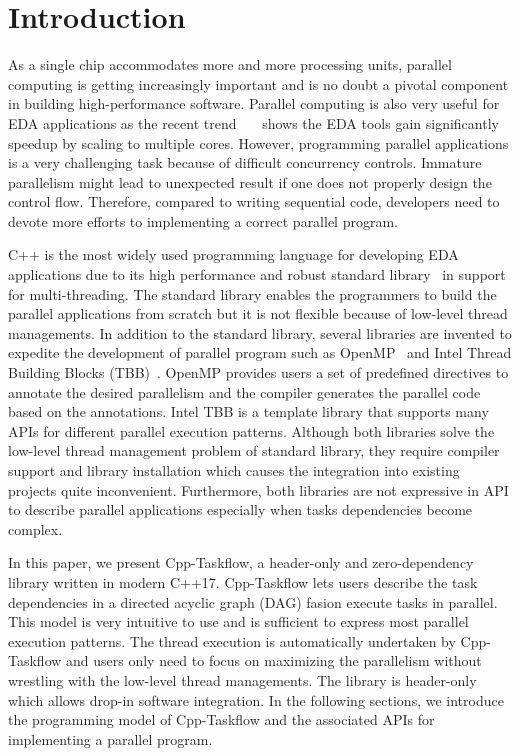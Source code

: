 \documentclass[sigconf]{acmart}
\begin{document}
\section{Introduction}
\label{sec::introduction}
As a single chip accommodates more and more processing units,
parallel computing is getting increasingly important
and is no doubt a pivotal
component in building high-performance software. 
Parallel computing is also very useful for EDA applications as the recent
trend~\cite{routing}~\cite{ot}~\cite{stok}\cite{Lu2018} shows the EDA tools gain significantly speedup
by scaling to multiple cores. 
However, programming parallel applications is a very challenging task
because of difficult concurrency controls.
Immature parallelism might lead to unexpected result if one does not properly
design the control flow.  
Therefore, compared to writing sequential code, developers need to devote 
more efforts to implementing a correct parallel program.

C++ is the most widely used programming language for developing EDA
applications due to its high performance and robust standard library~\cite{cpp-thread}
in support for multi-threading.
The standard
library enables the programmers to build the parallel applications from scratch 
but it is not flexible because of low-level thread managements.
In addition to the standard library, several libraries are invented to expedite
the development of parallel program such as OpenMP~\cite{openmp} and Intel
Thread Building Blocks (TBB)~\cite{tbb}. OpenMP provides users a set of
predefined directives to annotate the desired parallelism and the compiler generates
the parallel code based on the annotations. Intel TBB is a template library that supports 
many APIs for different parallel execution patterns. Although both libraries 
solve the low-level thread management problem of standard library, they require
compiler support and library installation which causes the integration
into existing projects quite inconvenient. Furthermore, both libraries 
are not expressive in API to describe parallel applications especially
when tasks dependencies become complex.

In this paper, we present Cpp-Taskflow, a header-only and zero-dependency library written in 
modern C++17. Cpp-Taskflow lets users describe the 
task dependencies in a directed acyclic graph (DAG) fasion execute tasks in parallel.
This model is very intuitive to use
and is sufficient to express most parallel execution patterns. 
The thread execution is automatically undertaken by Cpp-Taskflow and users only need to
focus on maximizing the parallelism without wrestling with the low-level thread
managements. The library is header-only which allows drop-in software integration.
In the following sections, we introduce the programming
model of Cpp-Taskflow and the associated APIs for implementing a parallel
program.
\end{document}
